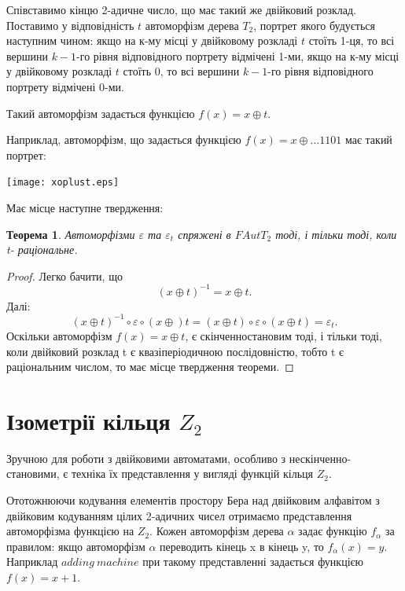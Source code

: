 \documentclass[a4paper,12pt]{article} \usepackage{a4wide}
\numberwithin{equation}{subsection}
\newtheorem{theorem}{Теорема}[subsection]
\begin{document}
Співставимо кінцю  2-адичне число, що має такий же двійковий розклад.
Поставимо у відповідність $t$ автоморфізм дерева $T_2$, портрет якого будується наступним чином:
якщо на к-му місці у двійковому розкладі $t$ стоїть 1-ця, то всі вершини $k-1$-го рівня відповідного портрету відмічені 1-ми,
якщо на к-му місці у двійковому розкладі $t$ стоїть 0, то всі вершини $k-1$-го рівня відповідного портрету відмічені 0-ми.

Такий автоморфізм задається функцією $f(x)=x\oplus t$.

 Наприклад, автоморфізм, що задається функцією $f(x)=x\oplus ...1101$ має такий портрет:

\begin{center}
\texttt{[image: xoplust.eps]}
\end{center}
Має місце наступне твердження:
\begin{theorem}\label{sp1}
Автоморфізми $\varepsilon$ та $\varepsilon_t$ спряжені в $FAutT_2$ тоді, і тільки тоді, коли t- раціональне.

\end{theorem}
\begin{proof}
Легко бачити, що $$(x\oplus t)^{-1}=x\oplus t.$$
Далі: $$(x\oplus t)^{-1}\circ\varepsilon \circ (x\oplus) t=(x\oplus t)\circ\varepsilon \circ (x\oplus t)= \varepsilon_t.$$
Оскільки автоморфізм $f(x)=x\oplus t$, є скінченностановим тоді, і тільки тоді, коли двійковий розклад t є квазіперіодичною послідовністю, тобто t є раціональним числом, то має місце твердження теореми.
\end{proof}

\newpage
\bigskip
\section{Ізометрії кільця $Z_2$}
Зручною для роботи з двійковими автоматами, особливо з
нескінченно-становими, є техніка їх представлення у вигляді функцій
кільця $Z_2$.

Ототожнюючи кодування елементів простору Бера над двійковим алфавітом
з двійковим кодуванням цілих 2-адичних чисел отримаємо представлення
автоморфізма функцією на $Z_2$. Кожен автоморфізм дерева $\alpha$
задає функцію $f_\alpha$ за правилом: якщо автоморфізм $\alpha$
переводить кінець x в кінець y, то $f_\alpha(x)=y$. Наприклад $adding
\ machine$ при такому представленні задається функцією $f(x)=x+1$.
\end{document}
